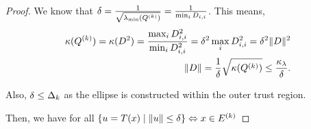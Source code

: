 \begin{proof}


We know that $\delta = \frac 1 {\sqrt{\lambda_{\text{min}}({Q^{(k)}})}} = \frac 1 {\min_{i} D_{i, i}}$.
This means,
\begin{align*}
\kappa({Q^{(k)}}) = \kappa(D^2) = \frac{\max_{i}D_{i,i}^2}{\min_{i}D_{i,i}^2} = \delta^2 \max_{i}D_{i,i}^2 = \delta^2 \|D\|^2 \\
\|D\| = \frac 1 {\delta} \sqrt{\kappa({Q^{(k)}})} \le \frac{\kappa_{\lambda}}{\delta}.
\end{align*}

Also, $\delta \le \Delta_k$ as the ellipse is constructed within the outer trust region.
\color{red}



\color{black}

Then, we have for all $\{u = T(x) \; | \; \|u\| \le \delta \} \Leftrightarrow x \in {E^{(k)}}$


% 


\end{proof}
